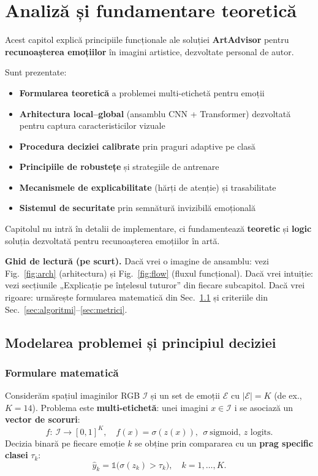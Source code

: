 \chapter{Analiză și fundamentare teoretică}
\label{ch:analiza}

\newcommand{\boxblock}[2][0.86\linewidth]{\fbox{\parbox{#1}{\centering #2}}}
\newcommand{\smallbox}[2][0.38\linewidth]{\fbox{\parbox{#1}{\centering #2}}}

Acest capitol explică principiile funcționale ale soluției \textbf{ArtAdvisor} pentru \textbf{recunoașterea emoțiilor} în imagini artistice, dezvoltate personal de autor. 

Sunt prezentate:
\begin{itemize}
    \item \textbf{Formularea teoretică} a problemei multi-etichetă pentru emoții
    \item \textbf{Arhitectura local–global} (ansamblu CNN + Transformer) dezvoltată pentru captura caracteristicilor vizuale
    \item \textbf{Procedura deciziei calibrate} prin praguri adaptive pe clasă
    \item \textbf{Principiile de robustețe} și strategiile de antrenare
    \item \textbf{Mecanismele de explicabilitate} (hărți de atenție) și trasabilitate
    \item \textbf{Sistemul de securitate} prin semnătură invizibilă emoțională
\end{itemize}

Capitolul nu intră în detalii de implementare, ci fundamentează \textbf{teoretic} și \textbf{logic} soluția dezvoltată pentru recunoașterea emoțiilor în artă.

\medskip
\noindent\textbf{Ghid de lectură (pe scurt).}
Dacă vrei o imagine de ansamblu: vezi Fig.~\ref{fig:arch} (arhitectura) și Fig.~\ref{fig:flow} (fluxul funcțional). Dacă vrei intuiție: vezi secțiunile „Explicație pe înțelesul tuturor” din fiecare subcapitol. Dacă vrei rigoare: urmărește formularea matematică din Sec.~\ref{sec:modelare} și criteriile din Sec.~\ref{sec:algoritmi}–\ref{sec:metrici}.

\section{Modelarea problemei și principiul deciziei}
\label{sec:modelare}

\subsection{Formulare matematică}
Considerăm spațiul imaginilor RGB $\mathcal{I}$ și un set de emoții $\mathcal{E}$ cu $|\mathcal{E}|=K$ (de ex., $K=14$). Problema este \textbf{multi-etichetă}: unei imagini $x\in\mathcal{I}$ i se asociază un \textbf{vector de scoruri}:
\[
f:\ \mathcal{I} \rightarrow [0,1]^K,\quad f(x)=\sigma(z(x)),\ \ \sigma\ \text{sigmoid, } z \text{ logits}.
\]
Decizia binară pe fiecare emoție $k$ se obține prin compararea cu un \textbf{prag specific clasei} $\tau_k$:
\[
\hat{y}_k = \mathbb{1}\big(\sigma(z_k) > \tau_k\big),\quad k=1,\dots,K.
\]

